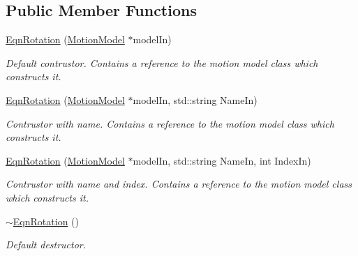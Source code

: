 \subsection*{Public Member Functions}
\begin{DoxyCompactItemize}
\item 
\hyperlink{classosea_1_1ofreq_1_1_eqn_rotation_ad7db707de22fbc8675beda31f20a1bfe}{Eqn\-Rotation} (\hyperlink{classosea_1_1ofreq_1_1_motion_model}{Motion\-Model} $\ast$model\-In)
\begin{DoxyCompactList}\small\item\em Default contrustor. Contains a reference to the motion model class which constructs it. \end{DoxyCompactList}\item 
\hyperlink{classosea_1_1ofreq_1_1_eqn_rotation_a157f992af361fd8935c09acff55aa25c}{Eqn\-Rotation} (\hyperlink{classosea_1_1ofreq_1_1_motion_model}{Motion\-Model} $\ast$model\-In, std\-::string Name\-In)
\begin{DoxyCompactList}\small\item\em Contrustor with name. Contains a reference to the motion model class which constructs it. \end{DoxyCompactList}\item 
\hyperlink{classosea_1_1ofreq_1_1_eqn_rotation_ae85fd4be31900819f56768f4eff19644}{Eqn\-Rotation} (\hyperlink{classosea_1_1ofreq_1_1_motion_model}{Motion\-Model} $\ast$model\-In, std\-::string Name\-In, int Index\-In)
\begin{DoxyCompactList}\small\item\em Contrustor with name and index. Contains a reference to the motion model class which constructs it. \end{DoxyCompactList}\item 
\hypertarget{classosea_1_1ofreq_1_1_eqn_rotation_a13f491e18770b8412b3babb610068d8c}{\hyperlink{classosea_1_1ofreq_1_1_eqn_rotation_a13f491e18770b8412b3babb610068d8c}{$\sim$\-Eqn\-Rotation} ()}\label{classosea_1_1ofreq_1_1_eqn_rotation_a13f491e18770b8412b3babb610068d8c}

\begin{DoxyCompactList}\small\item\em Default destructor. \end{DoxyCompactList}\end{DoxyCompactItemize}
